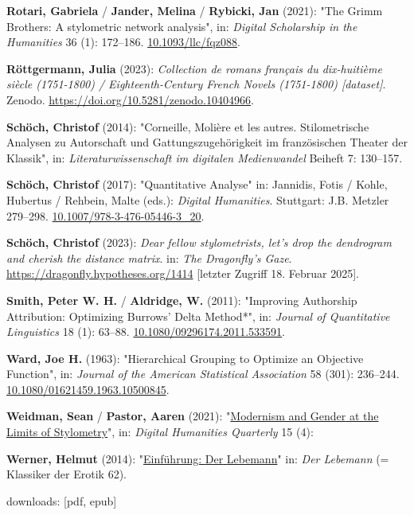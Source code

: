 \documentclass[
  12pt,
  letterpaper,
]{classicthesis}
\newlength{\cslhangindent}
\newenvironment{CSLReferences}[2] %
 {\begin{list}{}{%
  \setlength{\itemindent}{0pt}
  \setlength{\leftmargin}{0pt}
  \setlength{\parsep}{0pt}
  \ifodd #1
   \setlength{\leftmargin}{\cslhangindent}
   \setlength{\itemindent}{-1\cslhangindent}
  \fi
  \setlength{\itemsep}{#2\baselineskip}}}
 {\end{list}}
\begin{document}
\begin{CSLReferences}{1}{0}
\textbf{Rotari, Gabriela} / \textbf{Jander, Melina} / \textbf{Rybicki,
Jan} (2021): "The {Grimm} {Brothers}: {A} stylometric network analysis",
in: \emph{Digital Scholarship in the Humanities} 36 (1): 172--186.
\href{https://doi.org/10.1093/llc/fqz088}{10.1093/llc/fqz088}.

\textbf{Röttgermann, Julia} (2023): \emph{Collection de romans français
du dix-huitième siècle (1751-1800) / {Eighteenth}-{Century} {French}
{Novels} (1751-1800) {[}dataset{]}}. Zenodo.
\url{https://doi.org/10.5281/zenodo.10404966}.

\textbf{Schöch, Christof} (2014): "Corneille, {Molière} et les autres.
{Stilometrische} {Analysen} zu {Autorschaft} und {Gattungszugehörigkeit}
im französischen {Theater} der {Klassik}", in:
\emph{Literaturwissenschaft im digitalen Medienwandel} Beiheft 7:
130--157.

\textbf{Schöch, Christof} (2017): "Quantitative {Analyse}" in: Jannidis,
Fotis / Kohle, Hubertus / Rehbein, Malte (eds.): \emph{Digital
{Humanities}}. Stuttgart: J.B. Metzler 279--298.
\href{https://doi.org/10.1007/978-3-476-05446-3_20}{10.1007/978-3-476-05446-3\_20}.

\textbf{Schöch, Christof} (2023): \emph{Dear fellow stylometrists, let's
drop the dendrogram and cherish the distance matrix}. in: \emph{The
Dragonfly's Gaze}. \url{https://dragonfly.hypotheses.org/1414}
{[}letzter Zugriff 18. Februar 2025{]}.

\textbf{Smith, Peter W. H.} / \textbf{Aldridge, W.} (2011): "Improving
{Authorship} {Attribution}: {Optimizing} {Burrows}' {Delta} {Method}*",
in: \emph{Journal of Quantitative Linguistics} 18 (1): 63--88.
\href{https://doi.org/10.1080/09296174.2011.533591}{10.1080/09296174.2011.533591}.

\textbf{Ward, Joe H.} (1963): "Hierarchical {Grouping} to {Optimize} an
{Objective} {Function}", in: \emph{Journal of the American Statistical
Association} 58 (301): 236--244.
\href{https://doi.org/10.1080/01621459.1963.10500845}{10.1080/01621459.1963.10500845}.

\textbf{Weidman, Sean} / \textbf{Pastor, Aaren} (2021):
"\href{https://www.digitalhumanities.org/dhq/vol/15/4/000566/000566.html}{Modernism
and {Gender} at the {Limits} of {Stylometry}}", in: \emph{Digital
Humanities Quarterly} 15 (4):

\textbf{Werner, Helmut} (2014):
"\href{https://seyerlein.de/shop/item/9783944964744/klassiker-der-erotik-62-der-lebemann-von-andrea-de-nerciat-e-book-epub}{Einführung:
{Der} {Lebemann}}" in: \emph{Der {Lebemann}} (= Klassiker der {Erotik}
62).

\end{CSLReferences}



\printindex

downloads: [pdf, epub]
\end{document}
